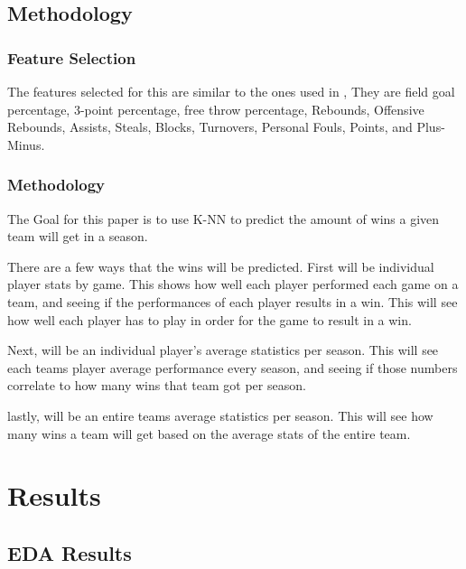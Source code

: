 \documentclass[11pt]{article}
\begin{document}
 

    \hypertarget{methodology}{%
\subsection{Methodology}\label{methodology}}

\subsubsection{Feature Selection}

The features selected for this are similar to the ones used in \cite{Horvat_Job_Medved_2018}, They are field goal percentage, 3-point percentage, free throw percentage, Rebounds, Offensive Rebounds, Assists, Steals, Blocks, Turnovers, Personal Fouls, Points, and Plus-Minus.

\subsubsection{Methodology}

The Goal for this paper is to use K-NN to predict the amount of wins a given team will get in a season.
 
\medskip

There are a few ways that the wins will be predicted. First will be individual player stats by game. This shows how well each player performed each game on a team, and seeing if the performances of each player results in a win. This will see how well each player has to play in order for the game to result in a win.
\medskip

Next, will be an individual player's average statistics per season. This will see each teams player average performance every season, and seeing if those numbers correlate to how many wins that team got per season. 

\medskip

lastly, will be an entire teams average statistics per season. This will see how many wins a team will get based on the average stats of the entire team.



    

   
\section{Results}
\subsection{EDA Results}
\end{document}
